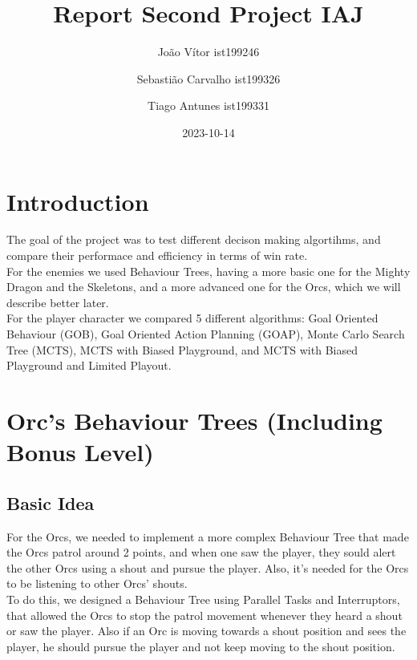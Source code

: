 \documentclass{article}
\title{Report Second Project IAJ}
\author{João Vítor ist199246
  \and Sebastião Carvalho ist199326
  \and Tiago Antunes ist199331}
\date{2023-10-14}
\begin{document}
  \maketitle
  \tableofcontents
  \newpage
  \section{Introduction}
  The goal of the project was to test different decison making algortihms, and compare their performace and efficiency in terms of win rate. \\
  For the enemies we used Behaviour Trees, having a more basic one for the Mighty Dragon and the Skeletons, and a more advanced one for the Orcs, 
  which we will describe better later.\\
  For the player character we compared 5 different algorithms: Goal Oriented Behaviour (GOB), Goal Oriented Action Planning (GOAP), Monte Carlo Search Tree (MCTS),
  MCTS with Biased Playground, and MCTS with Biased Playground and Limited Playout.
  \section{Orc's Behaviour Trees (Including Bonus Level)}
  \subsection{Basic Idea}
  For the Orcs, we needed to implement a more complex Behaviour Tree that made the Orcs patrol around 2 points, and when one saw the player, they sould alert the other Orcs
  using a shout and pursue the player. Also, it's needed for the Orcs to be listening to other Orcs' shouts. \\
  To do this, we designed a Behaviour Tree using Parallel Tasks and Interruptors, that allowed the Orcs to stop the patrol movement whenever they heard a shout or 
  saw the player. Also if an Orc is moving towards a shout position and sees the player, he should pursue the player and not keep moving to the shout position.\\
\end{document}
